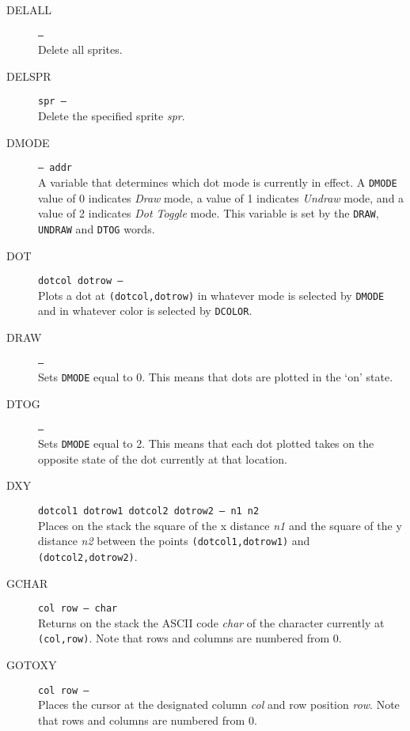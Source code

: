 \documentclass{article}
\begin{document}
\begin{multicols}{2}[]
\begin{description}
			\item[DELALL]\texttt{--- }\\
				Delete all sprites.

			\item[DELSPR]\texttt{spr --- }\\
				Delete the specified sprite \textit{spr}.

			\item[DMODE]\texttt{--- addr }\\
				A variable that determines which dot mode is currently in effect.
				A \verb|DMODE| value of 0 indicates \textit{Draw} mode, a value of 1
				indicates \textit{Undraw} mode, and a value of 2 indicates
				\textit{Dot Toggle} mode. This variable is set by the \verb|DRAW|,
				\verb|UNDRAW| and \verb|DTOG| words.

			\item[DOT]\texttt{dotcol dotrow --- }\\
				Plots a dot at \verb|(dotcol,dotrow)| in whatever mode is selected
				by \verb|DMODE| and in whatever color is selected by \verb|DCOLOR|.

			\item[DRAW]\texttt{--- }\\
				Sets \verb|DMODE| equal to 0. This means that dots are plotted in
				the `on' state.

			\item[DTOG]\texttt{--- }\\
				Sets \verb|DMODE| equal to 2. This means that each dot plotted
				takes on the opposite state of the dot currently at that location.

			\item[DXY]\texttt{dotcol1 dotrow1 dotcol2 dotrow2 --- n1 n2 }\\
				Places on the stack the square of the x distance \textit{n1} and
				the square of the y distance \textit{n2} between the points
				\verb|(dotcol1,dotrow1)| and \verb|(dotcol2,dotrow2)|.

			\item[GCHAR]\texttt{col row --- char }\\
				Returns on the stack the ASCII code \textit{char} of the character
				currently at \verb|(col,row)|. Note that rows and columns are
				numbered from 0.

			\item[GOTOXY]\texttt{col row --- }\\
				Places the cursor at the designated column \textit{col} and row
				position \textit{row}. Note that rows and columns are numbered
				from 0.


\end{description}
\end{multicols}
\end{document}
